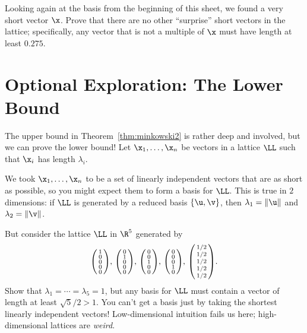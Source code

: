 \begin{explor}
	Looking again at the basis from the beginning of this sheet, we found a very short vector $\x$. Prove that there are no other ``surprise'' short vectors in the lattice; specifically, any vector that is not a multiple of $\x$ must have length at least $0.275$.
\end{explor}

\pagebreak

\section*{Optional Exploration: The Lower Bound}
The upper bound in Theorem~\ref{thm:minkowski2} is rather deep and involved, but we can prove the lower bound! Let $\x_1,\ldots,\x_n$ be vectors in a lattice $\LL$ such that $\x_i$ has length $\lambda_i$.


\newlength{\tempboxsep}
\setlength{\tempboxsep}{\boxsep}
\setlength{\boxsep}{5pt}

\begin{explor}
	We took $\x_1,\ldots,\x_n$ to be a set of linearly independent vectors that are as short as possible, so you might expect them to form a basis for $\LL$. This is true in $2$ dimensions: if $\LL$ is generated by a reduced basis $\{\u,\v\}$, then $\lambda_1=\|\u\|$ and $\lambda_2=\|\v\|$. 
	
	But consider the lattice $\LL$ in $\R^5$ generated by
	\[\begin{psmallmatrix}
	1\\0\\0\\0\\0
	\end{psmallmatrix},\,\begin{psmallmatrix}
	0\\1\\0\\0\\0
	\end{psmallmatrix},\,\begin{psmallmatrix}
	0\\0\\1\\0\\0
	\end{psmallmatrix},\,\begin{psmallmatrix}
	0\\0\\0\\1\\0
	\end{psmallmatrix},\,\begin{psmallmatrix}
	1/2\\1/2\\1/2\\1/2\\1/2
	\end{psmallmatrix}.\]
	Show that $\lambda_1=\cdots=\lambda_5=1$, but any basis for $\LL$ must contain a vector of length at least $\sqrt{5}/2>1$. You can't get a basis just by taking the shortest linearly independent vectors! Low-dimensional intuition fails us here; high-dimensional lattices are \emph{weird}.
\end{explor}

